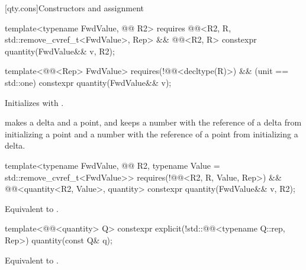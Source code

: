 [qty.cons]{Constructors and assignment}

\begin{itemdecl}
template<typename FwdValue, @@ R2>
  requires @@<R2{}, R, std::remove_cvref_t<FwdValue>, Rep> &&
           @@<R2, R>
constexpr quantity(FwdValue&& v, R2);

template<@@<Rep> FwdValue>
  requires(!@@<decltype(R)>) && (unit == std::one)
constexpr quantity(FwdValue&& v);
\end{itemdecl}

\begin{itemdescr}
\pnum
\effects
Initializes  with .

\pnum
\begin{note}
 makes  a delta
and  a point,
and keeps a number with the reference of a delta from initializing a point
and a number with the reference of a point from initializing a delta.
\end{note}
\end{itemdescr}

\begin{itemdecl}
template<typename FwdValue, @@ R2, typename Value = std::remove_cvref_t<FwdValue>>
  requires(!@@<R2{}, R, Value, Rep>) &&
          @@<quantity<R2{}, Value>, quantity>
constexpr quantity(FwdValue&& v, R2);
\end{itemdecl}

\begin{itemdescr}
\pnum
\effects
Equivalent to
.
\end{itemdescr}

\begin{itemdecl}
template<@@<quantity> Q>
constexpr explicit(!std::@@<typename Q::rep, Rep>) quantity(const Q& q);
\end{itemdecl}

\begin{itemdescr}
\pnum
\effects
Equivalent to .
\end{itemdescr}


